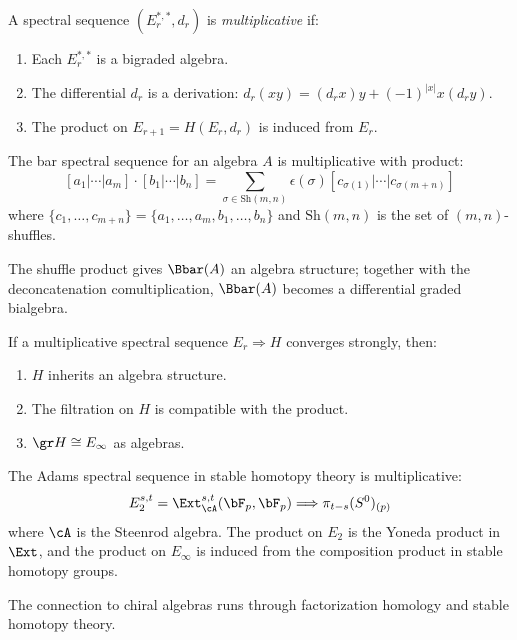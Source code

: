 \begin{definition}
\label{def:mult-ss}
A spectral sequence $(E_r^{*,*}, d_r)$ is \emph{multiplicative} if:
\begin{enumerate}[label=(\roman*)]
\item Each $E_r^{*,*}$ is a bigraded algebra.
\item The differential $d_r$ is a derivation: $d_r(xy) = (d_r x) y + (-1)^{|x|} x (d_r y)$.
\item The product on $E_{r+1} = H(E_r, d_r)$ is induced from $E_r$.
\end{enumerate}
\end{definition}

\begin{proposition}
\label{prop:bar-ss-mult}
The bar spectral sequence for an algebra $A$ is multiplicative with product:
\[
[a_1|\cdots|a_m] \cdot [b_1|\cdots|b_n] = \sum_{\sigma \in \mathrm{Sh}(m,n)} 
\epsilon(\sigma) [c_{\sigma(1)}|\cdots|c_{\sigma(m+n)}]
\]
where $\{c_1, \ldots, c_{m+n}\} = \{a_1, \ldots, a_m, b_1, \ldots, b_n\}$ and 
$\mathrm{Sh}(m,n)$ is the set of $(m,n)$-shuffles.

The shuffle product gives $\Bbar(A)$ an algebra structure; together with the deconcatenation comultiplication, $\Bbar(A)$ becomes a differential graded bialgebra.
\end{proposition}

\begin{theorem}
\label{thm:mult-ss-conv}
If a multiplicative spectral sequence $E_r \Rightarrow H$ converges strongly, 
then:
\begin{enumerate}[label=(\roman*)]
\item $H$ inherits an algebra structure.
\item The filtration on $H$ is compatible with the product.
\item $\gr H \cong E_\infty$ as algebras.
\end{enumerate}
\end{theorem}

\begin{example}
\label{ex:adams-ss}
The Adams spectral sequence in stable homotopy theory is multiplicative:
\[
E_2^{s,t} = \Ext_{\cA}^{s,t}(\bF_p, \bF_p) \Longrightarrow \pi_{t-s}(S^0)_{(p)}
\]
where $\cA$ is the Steenrod algebra. The product on $E_2$ is the Yoneda product 
in $\Ext$, and the product on $E_\infty$ is induced from the composition product 
in stable homotopy groups.

The connection to chiral algebras runs through factorization
homology and stable homotopy theory.
\end{example}
